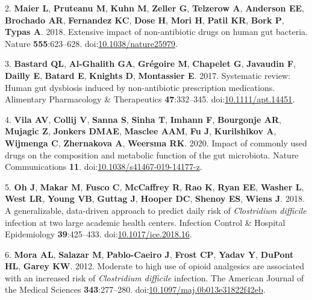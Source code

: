 \documentclass[
  11pt,
]{article}
\begin{document}
\leavevmode\hypertarget{ref-Maier2018}{}%
2. \textbf{Maier L}, \textbf{Pruteanu M}, \textbf{Kuhn M},
\textbf{Zeller G}, \textbf{Telzerow A}, \textbf{Anderson EE},
\textbf{Brochado AR}, \textbf{Fernandez KC}, \textbf{Dose H},
\textbf{Mori H}, \textbf{Patil KR}, \textbf{Bork P}, \textbf{Typas A}.
2018. Extensive impact of non-antibiotic drugs on human gut bacteria.
Nature \textbf{555}:623--628.
doi:\href{https://doi.org/10.1038/nature25979}{10.1038/nature25979}.

\leavevmode\hypertarget{ref-LeBastard2017}{}%
3. \textbf{Bastard QL}, \textbf{Al-Ghalith GA}, \textbf{Grégoire M},
\textbf{Chapelet G}, \textbf{Javaudin F}, \textbf{Dailly E},
\textbf{Batard E}, \textbf{Knights D}, \textbf{Montassier E}. 2017.
Systematic review: Human gut dysbiosis induced by non-antibiotic
prescription medications. Alimentary Pharmacology \& Therapeutics
\textbf{47}:332--345.
doi:\href{https://doi.org/10.1111/apt.14451}{10.1111/apt.14451}.

\leavevmode\hypertarget{ref-VichVila2020}{}%
4. \textbf{Vila AV}, \textbf{Collij V}, \textbf{Sanna S}, \textbf{Sinha
T}, \textbf{Imhann F}, \textbf{Bourgonje AR}, \textbf{Mujagic Z},
\textbf{Jonkers DMAE}, \textbf{Masclee AAM}, \textbf{Fu J},
\textbf{Kurilshikov A}, \textbf{Wijmenga C}, \textbf{Zhernakova A},
\textbf{Weersma RK}. 2020. Impact of commonly used drugs on the
composition and metabolic function of the gut microbiota. Nature
Communications \textbf{11}.
doi:\href{https://doi.org/10.1038/s41467-019-14177-z}{10.1038/s41467-019-14177-z}.

\leavevmode\hypertarget{ref-Oh2018}{}%
5. \textbf{Oh J}, \textbf{Makar M}, \textbf{Fusco C}, \textbf{McCaffrey
R}, \textbf{Rao K}, \textbf{Ryan EE}, \textbf{Washer L}, \textbf{West
LR}, \textbf{Young VB}, \textbf{Guttag J}, \textbf{Hooper DC},
\textbf{Shenoy ES}, \textbf{Wiens J}. 2018. A generalizable, data-driven
approach to predict daily risk of \emph{Clostridium difficile} infection
at two large academic health centers. Infection Control \& Hospital
Epidemiology \textbf{39}:425--433.
doi:\href{https://doi.org/10.1017/ice.2018.16}{10.1017/ice.2018.16}.

\leavevmode\hypertarget{ref-Mora2012}{}%
6. \textbf{Mora AL}, \textbf{Salazar M}, \textbf{Pablo-Caeiro J},
\textbf{Frost CP}, \textbf{Yadav Y}, \textbf{DuPont HL}, \textbf{Garey
KW}. 2012. Moderate to high use of opioid analgesics are associated with
an increased risk of \emph{Clostridium difficile} infection. The
American Journal of the Medical Sciences \textbf{343}:277--280.
doi:\href{https://doi.org/10.1097/maj.0b013e31822f42eb}{10.1097/maj.0b013e31822f42eb}.
\end{document}
